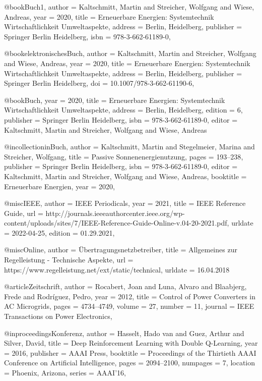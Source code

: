 
@book{Buch1,
 author = {Kaltschmitt, Martin and Streicher, Wolfgang and Wiese, Andreas},
 year = {2020},
 title = {Erneuerbare Energien: Systemtechnik Wirtschaftlichkeit Umweltaspekte},
 address = {Berlin, Heidelberg},
 publisher = {{Springer Berlin Heidelberg}},
 isbn = {978-3-662-61189-0},
}

@book{elektronischesBuch,
 author = {Kaltschmitt, Martin and Streicher, Wolfgang and Wiese, Andreas},
 year = {2020},
 title = {Erneuerbare Energien: Systemtechnik Wirtschaftlichkeit Umweltaspekte},
 address = {Berlin, Heidelberg},
 publisher = {{Springer Berlin Heidelberg}},
 doi = {10.1007/978-3-662-61190-6},
 }


@book{Buch,
 year = {2020},
 title = {Erneuerbare Energien: Systemtechnik Wirtschaftlichkeit Umweltaspekte},
 address = {Berlin, Heidelberg},
 edition = {6},
 publisher = {{Springer Berlin Heidelberg}},
 isbn = {978-3-662-61189-0},
 editor = {Kaltschmitt, Martin and Streicher, Wolfgang and Wiese, Andreas}
}

@incollection{inBuch,
 author = {Kaltschmitt, Martin and Stegelmeier, Marina and Streicher, Wolfgang},
 title = {Passive Sonnenenergienutzung},
 pages = {193--238},
 publisher = {{Springer Berlin Heidelberg}},
 isbn = {978-3-662-61189-0},
 editor = {Kaltschmitt, Martin and Streicher, Wolfgang and Wiese, Andreas},
 booktitle = {Erneuerbare Energien},
 year = {2020},
}

@misc{IEEE,
 author = {{IEEE Periodicals}},
 year = {2021},
 title = {IEEE Reference Guide},
 url = {http://journals.ieeeauthorcenter.ieee.org/wp-content/uploads/sites/7/IEEE-Reference-Guide-Online-v.04-20-2021.pdf},
 urldate = {2022-04-25},
 edition = {01.29.2021},
}

@misc{Online,
  author = {Übertragungsnetzbetreiber},
  title  = {Allgemeines zur Regelleistung - Technische Aspekte},
  url =  {https://www.regelleistung.net/ext/static/technical},
  urldate = {16.04.2018}
}

@article{Zeitschrift,
 author = {Rocabert, Joan and Luna, Alvaro and Blaabjerg, Frede and Rodr{\'i}guez, Pedro},
 year = {2012},
 title = {Control of Power Converters in AC Microgrids},
 pages = {4734--4749},
 volume = {27},
 number = {11},
 journal = {IEEE Transactions on Power Electronics},
}

@inproceedings{Konferenz,
author = {Hasselt, Hado van and Guez, Arthur and Silver, David},
title = {Deep Reinforcement Learning with Double Q-Learning},
year = {2016},
publisher = {AAAI Press},
booktitle = {Proceedings of the Thirtieth AAAI Conference on Artificial Intelligence},
pages = {2094–2100},
numpages = {7},
location = {Phoenix, Arizona},
series = {AAAI'16},
}

